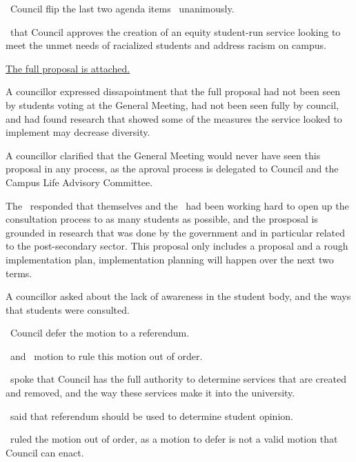 \begin{motion}
    \birt\ Council flip the last two agenda items
    \movers{\seneca}{\rebecca}
    \carries\ unanimously.
\end{motion}

\begin{motion}
    \birt\ that Council approves the creation of an equity student-run service
    looking to meet the unmet needs of racialized students and address racism
    on campus.
    \movers{\antonio}{\rebecca}

    \hyperref[equity]{The full proposal is attached.}

    A councillor expressed dissapointment that the full proposal had not been
    seen by students voting at the General Meeting, had not been seen fully by
    council, and had found research that showed some of the measures the 
    service looked to implement may decrease diversity.

    A councillor clarified that the General Meeting would never have seen this
    proposal in any process, as the aproval process is delegated to Council and
    the Campus Life Advisory Committee. 

    The \pres\ responded that themselves and the \vpi\ had been working hard
    to open up the consultation process to as many students as possible, and
    the prosposal is grounded in research that was done by the government and
    in particular related to the post-secondary sector. This proposal only 
    includes a proposal and a rough implementation plan, implementation 
    planning will happen over the next two terms.

    A councillor asked about the lack of awareness in the student body, and 
    the ways that students were consulted. 

    \begin{motion}
        \birt\ Council defer the motion to a referendum.
        \movers{\harsh}{\alexander}

        \seneca\ and \antonio\ motion to rule this motion out of order.

        \seneca\ spoke that Council has the full authority to determine
        services that are created and removed, and the way these services make
        it into the university.

        \harsh\ said that referendum should be used to determine student
        opinion.

        \elizabeth\ ruled the motion out of order, as a motion to defer is not
        a valid motion that Council can enact.
    \end{motion} 


\end{motion}
